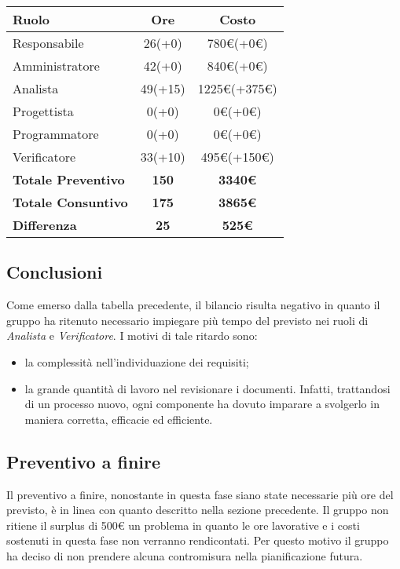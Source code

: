 {
	\begin{center}
		\renewcommand{\arraystretch}{1.4}
		\begin{tabularx}{10cm}{|X|c|c|}
			\hline
			\rowcolor{airforceblue}
			\textbf{Ruolo} & \textbf{Ore} & \textbf{Costo}\\
			\hline
			Responsabile & 26(+0) & 780\euro(+0\euro)\\
			\hline
			Amministratore & 42(+0) & 840\euro(+0\euro)\\
			\hline
			Analista & 49(+15) & 1225\euro(+375\euro)\\
			\hline
			Progettista & 0(+0) & 0\euro(+0\euro)\\
			\hline
			Programmatore & 0(+0) & 0\euro(+0\euro)\\
			\hline
			Verificatore & 33(+10) & 495\euro(+150\euro)\\
			\hline
			\textbf{Totale Preventivo} & \textbf{150} & \textbf{3340\euro}\\
			\hline
			\textbf{Totale Consuntivo} & \textbf{175} & \textbf{3865\euro}\\
			\hline
			\textbf{Differenza} & \textbf{25} & \textbf{525\euro}
		\end{tabularx}
	\end{center}

\subsection{Conclusioni}\label{ConsuntivoPeriodoDiAnalisiConclusioni}
Come emerso dalla tabella precedente, il bilancio risulta negativo in quanto il gruppo ha ritenuto necessario impiegare più tempo del previsto nei ruoli di \textit{Analista} e \textit{Verificatore}. I motivi di tale ritardo sono:
\begin{itemize}
	\item la complessità nell'individuazione dei requisiti;
	\item la grande quantità di lavoro nel revisionare i documenti. Infatti, trattandosi di un processo nuovo, ogni componente ha dovuto imparare a svolgerlo in maniera corretta, efficacie ed efficiente.
\end{itemize}

\subsection{Preventivo a finire}\label{ConsuntivoPeriodoDiAnalisiPreventivoAFinire}
Il preventivo a finire, nonostante in questa fase siano state necessarie più ore del previsto, è in linea con quanto descritto nella sezione precedente. Il gruppo non ritiene il surplus di 500\euro{} un problema in quanto le ore lavorative e i costi sostenuti in questa fase non verranno rendicontati. Per questo motivo il gruppo ha deciso di non prendere alcuna contromisura nella pianificazione futura.

}
